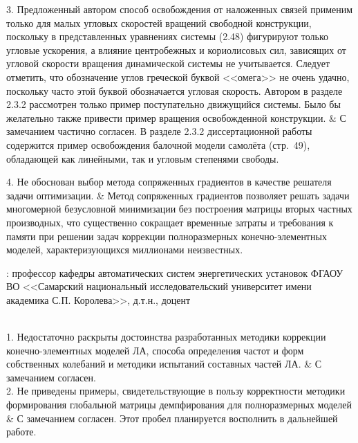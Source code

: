 \begin{frame}
	\vspace{0.3em}
	\begin{comtblr}{}
		3. Предложенный автором способ освобождения от наложенных связей применим только для малых угловых скоростей вращений свободной конструкции, поскольку в представленных уравнениях системы (2.48) фигурируют только угловые ускорения, а влияние центробежных и кориолисовых сил, зависящих от угловой скорости вращения динамической системы не учитывается. Следует отметить, что обозначение углов греческой буквой <<омега>> не очень удачно, поскольку часто этой буквой обозначается угловая скорость. Автором в разделе 2.3.2 рассмотрен только пример поступательно движущийся системы. Было бы желательно также привести пример вращения освобожденной конструкции.
		&
		С замечанием частично согласен. В разделе 2.3.2 диссертационной работы содержится пример освобождения балочной модели самолёта (стр.~49), обладающей как линейными, так и угловым степенями свободы. \\
	\end{comtblr}
\end{frame}

\begin{frame}
	\vspace{0.5em}
	\begin{comtblr}{12em}
		4. Не обоснован выбор метода сопряженных градиентов в качестве решателя задачи оптимизации.
		&
		Метод сопряженных градиентов позволяет решать задачи многомерной безусловной минимизации без построения матрицы вторых частных производных, что существенно сокращает временные затраты и требования к памяти при решении задач коррекции полноразмерных конечно-элементных моделей, характеризующихся миллионами неизвестных. 
	\end{comtblr}
\end{frame}

\begin{frame}
	\beginSkip
	: профессор кафедры автоматических систем энергетических установок ФГАОУ ВО <<Самарский национальный исследовательский университет имени академика С.П. Королева>>, д.т.н., доцент \\
	 \\
	\begin{comtblr}{}
		1. Недостаточно раскрыты достоинства разработанных методики коррекции конечно-элементных моделей ЛА, способа определения частот и форм собственных колебаний и методики испытаний составных частей ЛА.
		&
		С замечанием согласен. \\ 
		2. Не приведены примеры, свидетельствующие в пользу корректности методики формирования глобальной матрицы демпфирования для полноразмерных моделей 
		&
		С замечанием согласен. Этот пробел планируется восполнить в дальнейшей работе. \\
	\end{comtblr}
\end{frame}

